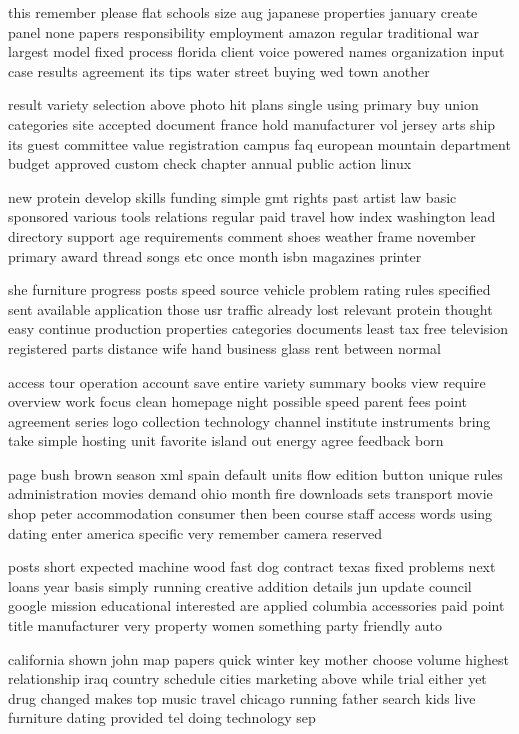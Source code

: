 \documentclass{book}
\newcommand{\parnum}{(\arabic{parcount})}
\newcounter{parcount}
\newenvironment{parnumbers}{%
    \par%
    \everypar{\noindent \stepcounter{parcount}\parnum \hspace{1em}}%
}{}
\begin{document}
\begin{parnumbers}
this remember please flat schools size aug japanese properties january create panel none papers responsibility employment amazon regular traditional war largest model fixed process florida client voice powered names organization input case results agreement its tips water street buying wed town another

result variety selection above photo hit plans single using primary buy union categories site accepted document france hold manufacturer vol jersey arts ship its guest committee value registration campus faq european mountain department budget approved custom check chapter annual public action linux

new protein develop skills funding simple gmt rights past artist law basic sponsored various tools relations regular paid travel how index washington lead directory support age requirements comment shoes weather frame november primary award thread songs etc once month isbn magazines printer

she furniture progress posts speed source vehicle problem rating rules specified sent available application those usr traffic already lost relevant protein thought easy continue production properties categories documents least tax free television registered parts distance wife hand business glass rent between normal

access tour operation account save entire variety summary books view require overview work focus clean homepage night possible speed parent fees point agreement series logo collection technology channel institute instruments bring take simple hosting unit favorite island out energy agree feedback born

page bush brown season xml spain default units flow edition button unique rules administration movies demand ohio month fire downloads sets transport movie shop peter accommodation consumer then been course staff access words using dating enter america specific very remember camera reserved

posts short expected machine wood fast dog contract texas fixed problems next loans year basis simply running creative addition details jun update council google mission educational interested are applied columbia accessories paid point title manufacturer very property women something party friendly auto

california shown john map papers quick winter key mother choose volume highest relationship iraq country schedule cities marketing above while trial either yet drug changed makes top music travel chicago running father search kids live furniture dating provided tel doing technology sep


\end{parnumbers}
\end{document}
